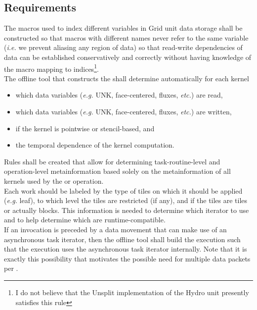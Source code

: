 \documentclass{article}
\begin{document}
\subsection{Requirements}

The macros used to index different variables in Grid unit data storage shall be
constructed so that macros with different names never refer to the same
variable (\textit{i.e.} we prevent aliasing any region of data) so that
read-write dependencies of data can be established conservatively and correctly
without having knowledge of the macro mapping to indices\footnote{I do not
believe that the Unsplit implementation of the Hydro unit presently satisfies
this rule}.\\

The offline tool that constructs the \AKG shall determine
automatically for each kernel
\begin{itemize}
\item{which data variables (\textit{e.g.} UNK, face-centered, fluxes,
\textit{etc.}) are read,}
\item{which data variables (\textit{e.g.} UNK, face-centered, fluxes,
\textit{etc.}) are written,}
\item{if the kernel is pointwise or stencil-based, and}
\item{the temporal dependence of the kernel computation.}
\end{itemize}

Rules shall be created that allow for determining task-routine-level and operation-level
metainformation based solely on the metainformation of all kernels used by the
\taskroutine or operation.
\\

Each work \taskroutine should be labeled by the type of tiles on which it should be
applied (\textit{e.g.} leaf), to which level the tiles are restricted (if any),
and if the tiles are tiles or actually blocks.  This information is needed to
determine which iterator to use and to help determine which \taskroutines are
runtime-compatible.\\

If an \OR invocation is preceded by a data movement that can make use of an
asynchronous task iterator, then the offline tool shall build the \OR
execution such that the execution uses the asynchronous task iterator
internally.  Note that it is exactly this possibility that motivates the
possible need for multiple data packets per \job.
\end{document}
